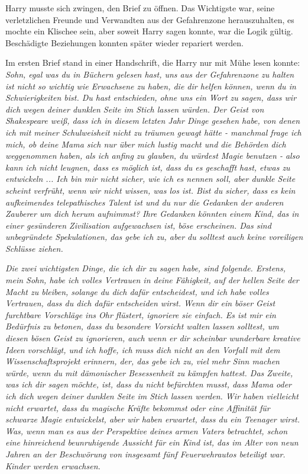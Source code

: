 Harry musste sich zwingen, den Brief zu öffnen. Das Wichtigste war, seine
verletzlichen Freunde und Verwandten aus der Gefahrenzone herauszuhalten, es
mochte ein Klischee sein, aber soweit Harry sagen konnte, war die Logik gültig.
Beschädigte Beziehungen konnten später wieder repariert werden.

Im ersten Brief stand in einer Handschrift, die Harry nur mit Mühe lesen konnte:
\emph{Sohn, egal was du in Büchern gelesen hast, uns aus der Gefahrenzone zu
halten ist nicht so wichtig wie Erwachsene zu haben, die dir helfen können, wenn
du in Schwierigkeiten bist. Du hast entschieden, ohne uns ein Wort zu sagen,
dass wir dich wegen deiner \glqq{}dunklen Seite\grqq{} im Stich lassen würden.
Der Geist von Shakespeare weiß, dass ich in diesem letzten Jahr Dinge gesehen
habe, von denen ich mit meiner Schulweisheit nicht zu träumen gewagt hätte -
manchmal frage ich mich, ob deine Mama sich nur über mich lustig macht und die
Behörden dich weggenommen haben, als ich anfing zu glauben, du würdest Magie
benutzen - also kann ich nicht leugnen, dass es möglich ist, dass du es
geschafft hast, etwas zu entwickeln ... Ich bin mir nicht sicher, wie ich es
nennen soll, aber \glqq{}dunkle Seite\grqq{} scheint verfrüht, wenn wir nicht
wissen, was los ist. Bist du sicher, dass es kein aufkeimendes telepathisches
Talent ist und du nur die Gedanken der anderen Zauberer um dich herum aufnimmst?
Ihre Gedanken könnten einem Kind, das in einer gesünderen Zivilisation
aufgewachsen ist, böse erscheinen. Das sind unbegründete Spekulationen, das gebe
ich zu, aber du solltest auch keine voreiligen Schlüsse ziehen.}

\emph{Die zwei wichtigsten Dinge, die ich dir zu sagen habe, sind folgende.
Erstens, mein Sohn, habe ich volles Vertrauen in deine Fähigkeit, auf der hellen
Seite der Macht zu bleiben, solange du dich dafür entscheidest, und ich habe
volles Vertrauen, dass du dich dafür entscheiden wirst. Wenn dir ein böser Geist
furchtbare Vorschläge ins Ohr flüstert, ignoriere sie einfach. Es ist mir ein
Bedürfnis zu betonen, dass du besondere Vorsicht walten lassen solltest, um
diesen bösen Geist zu ignorieren, auch wenn er dir scheinbar wunderbare kreative
Ideen vorschlägt, und ich hoffe, ich muss dich nicht an den Vorfall mit dem
Wissenschaftsprojekt erinnern, der, das gebe ich zu, viel mehr Sinn machen
würde, wenn du mit dämonischer Besessenheit zu kämpfen hattest. Das Zweite, was
ich dir sagen möchte, ist, dass du nicht befürchten musst, dass Mama oder ich
dich wegen deiner \glqq{}dunklen Seite\grqq{} im Stich lassen werden. Wir haben
vielleicht nicht erwartet, dass du magische Kräfte bekommst oder eine Affinität
für schwarze Magie entwickelst, aber wir haben erwartet, dass du ein Teenager
wirst. Was, wenn man es aus der Perspektive deines armen Vaters betrachtet,
schon eine hinreichend beunruhigende Aussicht für ein Kind ist, das im Alter von
neun Jahren an der Beschwörung von insgesamt fünf Feuerwehrautos beteiligt war.
}
\emph{Kinder werden erwachsen.}

